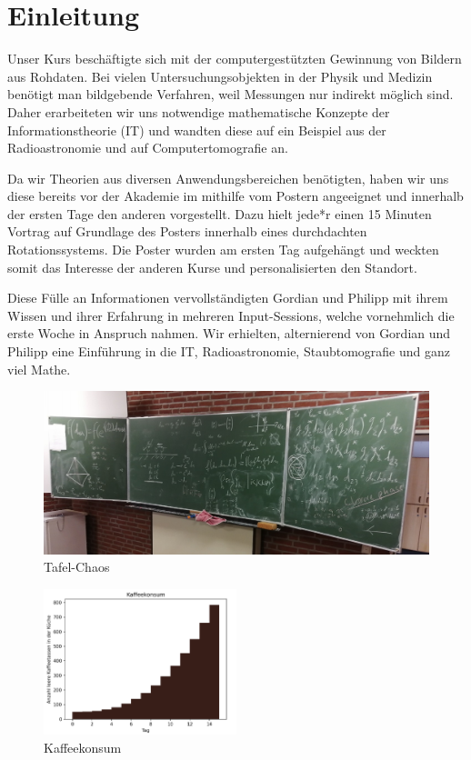 \section{Einleitung}

Unser Kurs beschäftigte sich mit der computergestützten Gewinnung von Bildern aus Rohdaten. Bei vielen Untersuchungsobjekten in der Physik und Medizin benötigt man bildgebende Verfahren, weil Messungen nur indirekt möglich sind. Daher erarbeiteten wir uns notwendige mathematische Konzepte der Informationstheorie (IT) und wandten diese auf ein Beispiel aus der Radioastronomie und auf Computertomografie an.

Da wir Theorien aus diversen Anwendungsbereichen benötigten, haben wir uns diese bereits vor der Akademie im mithilfe vom Postern angeeignet und innerhalb der ersten Tage den anderen vorgestellt. Dazu hielt jede*r einen 15 Minuten Vortrag auf Grundlage des Posters innerhalb eines durchdachten Rotationssystems. Die Poster wurden am ersten Tag aufgehängt und weckten somit das Interesse der anderen Kurse und personalisierten den Standort.

Diese Fülle an Informationen vervollständigten Gordian und Philipp mit ihrem Wissen und ihrer Erfahrung in mehreren Input-Sessions, welche vornehmlich die erste Woche in Anspruch nahmen. Wir erhielten, alternierend von Gordian und Philipp eine Einführung in die IT, Radioastronomie, Staubtomografie und ganz viel Mathe.

\begin{figure}
    \centering
    \includegraphics{k4.2/tafelbild.png}
    \caption{Tafel-Chaos}
\end{figure}

\begin{figure}
    \centering
	\includegraphics[width=0.5\textwidth]{k4.2/kaffee.png}
	\caption{Kaffeekonsum}
    \label{k4.2.fig.kaffee}
\end{figure}

